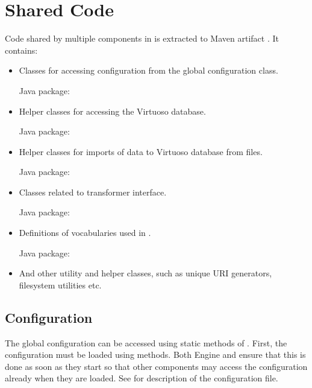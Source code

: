 \chapter{Shared Code}
Code shared by multiple components in \odcs is extracted to Maven artifact . It contains:

\begin{itemize}
	\item Classes for accessing configuration from the global configuration class.

		Java package: 
	\item Helper classes for accessing the Virtuoso database.

		Java package: 

	\item Helper classes for imports of data to Virtuoso database from files.

		Java package: 

	\item Classes related to transformer interface.

		Java package: 

	\item Definitions of vocabularies used in \odcs.

		Java package: 

	\item And other utility and helper classes, such as unique URI generators, filesystem utilities etc.
\end{itemize}

\section{Configuration}
The global configuration can be accessed using static methods of . First, the configuration must be loaded using  methods. Both Engine and \FE ensure that this is done as soon as they start so that other components may access the configuration already when they are loaded. See  for description of the configuration file.

